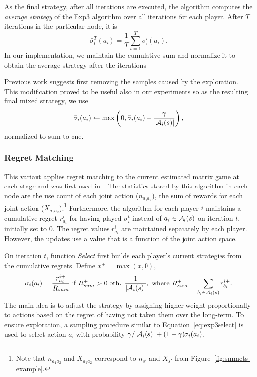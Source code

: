 As the final strategy, after all iterations are executed, the algorithm computes the \emph{average strategy} of the Exp3 algorithm over all iterations for each player.
 After $T$ iterations in the particular node, it is
\begin{equation}
\bar{\sigma}^T_i(a_i) = \frac{1}{T}\sum_{t=1}^T \sigma^t_i(a_i).
\end{equation}
In our implementation, we maintain the cumulative sum and normalize it to obtain the average strategy after the iterations.

Previous work \cite{Teytaud11Upper} suggests first removing the samples caused by the exploration.
This modification proved to be useful also in our experiments
so as the resulting final mixed strategy, we use
\begin{equation}
\bar{\sigma}_i(a_i) \leftarrow \max\left(0, \bar{\sigma}_i(a_i) - \frac{\gamma}{|\mathcal{A}_i(s)|}\right),
\end{equation}
normalized to sum to one.

\subsubsection{Regret Matching} \label{sec:rm}

This variant applies regret matching \cite{Hart00} to the current estimated matrix game at each stage and was first used in~\cite{Lanctot13Goofspiel}. The statistics stored by this algorithm in each node are the use count of each joint action ($n_{a_1a_2}$), the sum of rewards for each joint action ($X_{a_1a_2}$).\footnote{Note that $n_{a_1a_2}$ and $X_{a_1a_2}$ correspond to $n_{s'}$ and $X_{s'}$ from Figure~\ref{fig:smmcts-example}.}
Furthermore, the algorithm for each player $i$ maintains a cumulative regret $r^i_{a_i}$ for having played $\sigma_i^t$ instead of $a_i \in \mathcal{A}_i(s)$ on iteration $t$, initially set to 0. The regret values $r^i_{a_i}$ are maintained separately by each player. However, the updates use a value that is a function of the joint action space.

On iteration $t$, function \emph{\underline{Select}} first builds
each player's current strategies from the cumulative regrets. Define $x^+ = \max(x,0)$,
\begin{equation}
\label{eq:rm}
\sigma_i(a_i) = \frac{r^{i+}_{a_i}}{R^+_{sum}} \mbox{ if } R^+_{sum} > 0
\mbox{ oth. } \frac{1}{|\mathcal{A}_i(s)|}, \mbox{ where } R^+_{sum} = \sum_{b_i \in \mathcal{A}_i(s)}{r^{i+}_{b_i}}.
\end{equation}
The main idea is to adjust the strategy by assigning higher weight proportionally to actions based on the regret of having not taken them over the long-term.
To ensure exploration, a sampling procedure similar to Equation~\ref{eq:exp3select} is used to select action $a_i$ with probability
$\gamma/|\mathcal{A}_i(s)| + (1-\gamma) \sigma_i(a_i)$.

